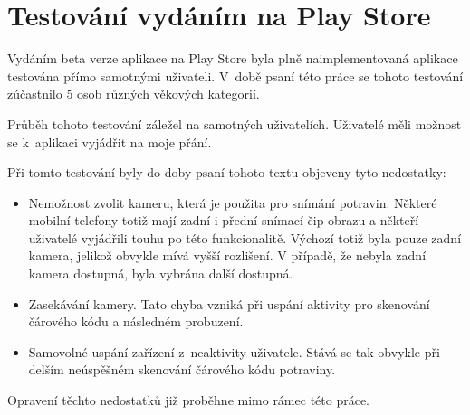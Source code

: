 \documentclass[thesis=B,czech]{FITthesis}[2013/10/20]
\begin{document}
\section{Testování vydáním na Play Store}

Vydáním beta verze aplikace na Play Store byla plně naimplementovaná aplikace testována přímo samotnými uživateli. V~době psaní této práce se tohoto testování zúčastnilo 5 osob různých věkových kategorií.

Průběh tohoto testování záležel na samotných uživatelích. Uživatelé měli možnost se k~aplikaci vyjádřit na moje přání.

Při tomto testování byly do doby psaní tohoto textu objeveny tyto nedostatky:

\begin{itemize}
	\item{Nemožnost zvolit kameru, která je použita pro snímání potravin. Některé mobilní telefony totiž mají zadní i přední snímací čip obrazu a někteří uživatelé vyjádřili touhu po této funkcionalitě. Výchozí totiž byla pouze zadní kamera, jelikož obvykle mívá vyšší rozlišení. V případě, že nebyla zadní kamera dostupná, byla vybrána další dostupná.}
	\item{Zasekávání kamery. Tato chyba vzniká při uspání aktivity pro skenování čárového kódu a následném probuzení.}
	\item{Samovolné uspání zařízení z~neaktivity uživatele. Stává se tak obvykle při delším neúspěšném skenování čárového kódu potraviny.}
\end{itemize}

Opravení těchto nedostatků již proběhne mimo rámec této práce.
\end{document}
